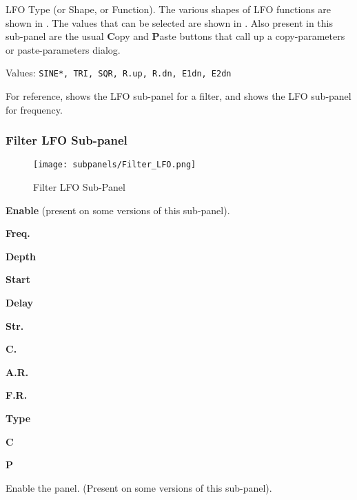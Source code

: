    LFO Type (or Shape, or Function).
   The various shapes of LFO functions are shown in
   .
   The values that can be selected are shown in
   .
   Also present in this sub-panel are the usual \textbf{C}opy
   and \textbf{P}aste buttons that call up a copy-parameters or
   paste-parameters dialog.

   Values: \texttt{SINE*, TRI, SQR, R.up, R.dn, E1dn, E2dn}

   For reference,
   shows the LFO sub-panel for a filter, and
   shows the LFO sub-panel for frequency.

\subsubsection{Filter LFO Sub-panel}
\label{subsubsec:filter_lfo_sub_panel}


\begin{figure}[H]
   \centering
   \texttt{[image: subpanels/Filter\_LFO.png]}
   \caption[Filter LFO Sub-Panel]{Filter LFO Sub-Panel}
   \label{fig:filter_lfo}
\end{figure}

   \begin{enumber}
      \item \textbf{Enable} (present on some versions of this sub-panel).
      \item \textbf{Freq.}
      \item \textbf{Depth}
      \item \textbf{Start}
      \item \textbf{Delay}
      \item \textbf{Str.}
      \item \textbf{C.}
      \item \textbf{A.R.}
      \item \textbf{F.R.}
      \item \textbf{Type}
      \item \textbf{C}
      \item \textbf{P}
   \end{enumber}

   \setcounter{ItemCounter}{0}      %

   Enable the panel.  (Present on some versions of this sub-panel).

